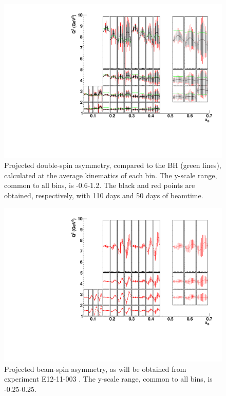 \begin{figure}  
\begin{center}
\includegraphics[width=200mm]{asym_polndvcs_dsa_newvgg_BH_100_50days_FT_and_noFT.pdf}
\caption[Projected double-spin asymmetry]
{Projected double-spin asymmetry, compared to the BH (green lines), calculated at the average kinematics of each bin. The y-scale range, common to all bins, is -0.6-1.2. The black and red points are obtained, respectively, with 110 days and 50 days of beamtime. }\label{fig_dsa_100_50_FT}
\end{center}
\end{figure}

\begin{figure}  
\begin{center}
\includegraphics[width=160mm]{asym_newcuts_bsa_newvgg.pdf}
\caption[Projected beam-spin asymmetry from E12-11-003]
{Projected beam-spin asymmetry, as will be obtained from experiment E12-11-003 \cite{proposal}. The y-scale range, common to all bins, is -0.25-0.25.}\label{fig_bsa}
\end{center}
\end{figure}
